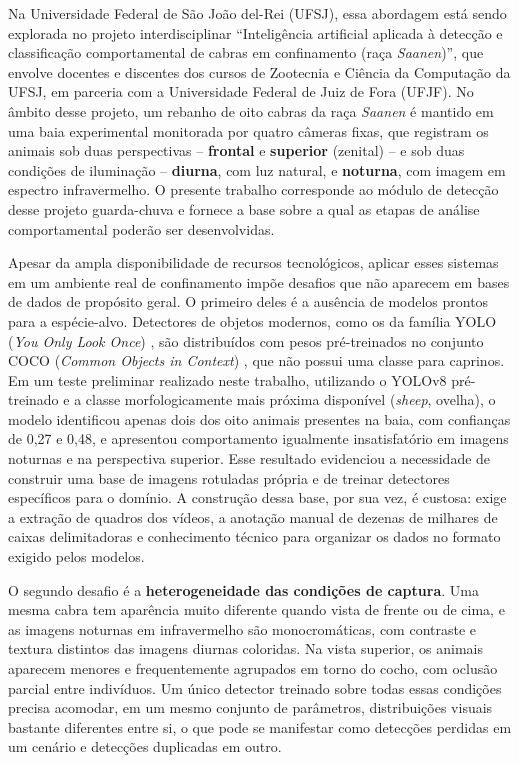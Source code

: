 \documentclass[12pt]{article}
\begin{document}
Na Universidade Federal de São João del-Rei (UFSJ), essa abordagem está sendo explorada no projeto interdisciplinar ``Inteligência artificial aplicada à detecção e classificação comportamental de cabras em confinamento (raça \textit{Saanen})'', que envolve docentes e discentes dos cursos de Zootecnia e Ciência da Computação da UFSJ, em parceria com a Universidade Federal de Juiz de Fora (UFJF). No âmbito desse projeto, um rebanho de oito cabras da raça \textit{Saanen} é mantido em uma baia experimental monitorada por quatro câmeras fixas, que registram os animais sob duas perspectivas -- \textbf{frontal} e \textbf{superior} (zenital) -- e sob duas condições de iluminação -- \textbf{diurna}, com luz natural, e \textbf{noturna}, com imagem em espectro infravermelho. O presente trabalho corresponde ao módulo de detecção desse projeto guarda-chuva e fornece a base sobre a qual as etapas de análise comportamental poderão ser desenvolvidas.

Apesar da ampla disponibilidade de recursos tecnológicos, aplicar esses sistemas em um ambiente real de confinamento impõe desafios que não aparecem em bases de dados de propósito geral. O primeiro deles é a ausência de modelos prontos para a espécie-alvo. Detectores de objetos modernos, como os da família YOLO (\textit{You Only Look Once}) \cite{redmon2016yolo, jocher2023yolov8}, são distribuídos com pesos pré-treinados no conjunto COCO (\textit{Common Objects in Context}) \cite{journals/corr/LinMBHPRDZ14}, que não possui uma classe para caprinos. Em um teste preliminar realizado neste trabalho, utilizando o YOLOv8 pré-treinado e a classe morfologicamente mais próxima disponível (\textit{sheep}, ovelha), o modelo identificou apenas dois dos oito animais presentes na baia, com confianças de 0,27 e 0,48, e apresentou comportamento igualmente insatisfatório em imagens noturnas e na perspectiva superior. Esse resultado evidenciou a necessidade de construir uma base de imagens rotuladas própria e de treinar detectores específicos para o domínio. A construção dessa base, por sua vez, é custosa: exige a extração de quadros dos vídeos, a anotação manual de dezenas de milhares de caixas delimitadoras e conhecimento técnico para organizar os dados no formato exigido pelos modelos.

O segundo desafio é a \textbf{heterogeneidade das condições de captura}. Uma mesma cabra tem aparência muito diferente quando vista de frente ou de cima, e as imagens noturnas em infravermelho são monocromáticas, com contraste e textura distintos das imagens diurnas coloridas. Na vista superior, os animais aparecem menores e frequentemente agrupados em torno do cocho, com oclusão parcial entre indivíduos. Um único detector treinado sobre todas essas condições precisa acomodar, em um mesmo conjunto de parâmetros, distribuições visuais bastante diferentes entre si, o que pode se manifestar como detecções perdidas em um cenário e detecções duplicadas em outro.
\end{document}
